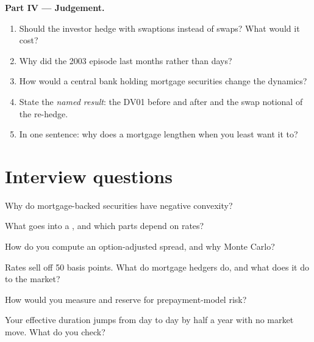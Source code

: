 \begin{problem}
\medskip\noindent\textbf{Part IV --- Judgement.}
\begin{enumerate}[resume]
\item Should the investor hedge with swaptions instead of swaps? What would it cost?
\item Why did the 2003 episode last months rather than days?
\item How would a central bank holding mortgage securities change the dynamics?
\item State the \emph{named result}: the DV01 before and after and the swap notional of
the re-hedge.
\item In one sentence: why does a mortgage lengthen when you least want it to?
\end{enumerate}
\end{problem}

\section{Interview questions}

\begin{interviewq}\label{iq:rc:mortgage-modelling:1}
Why do mortgage-backed securities have negative convexity?
\end{interviewq}

\begin{interviewq}\label{iq:rc:mortgage-modelling:2}
What goes into a , and which parts depend on rates?
\end{interviewq}

\begin{interviewq}\label{iq:rc:mortgage-modelling:3}
How do you compute an option-adjusted spread, and why Monte Carlo?
\end{interviewq}

\begin{interviewq}\label{iq:rc:mortgage-modelling:4}
Rates sell off 50 basis points. What do mortgage hedgers do, and what does it do to the
market?
\end{interviewq}

\begin{interviewq}\label{iq:rc:mortgage-modelling:5}
How would you measure and reserve for prepayment-model risk?
\end{interviewq}

\begin{interviewq}\label{iq:rc:mortgage-modelling:6}
Your effective duration jumps from day to day by half a year with no market move. What
do you check?
\end{interviewq}

